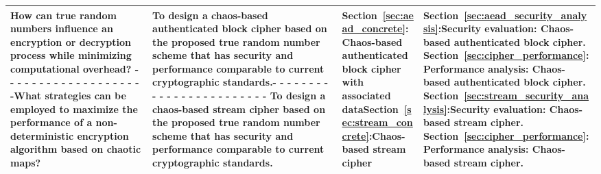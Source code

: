 {\begin{landscape}
\begin{table}[!htbp]
\begin{tabular}{M{5cm}p{6cm}M{5cm}p{7cm}}
\hline
How can true random numbers influence an encryption or decryption process while minimizing computational overhead? \newline - - - - - - - - - - - - - - - - - - - -\newline What strategies can be employed to maximize the performance of a non-deterministic encryption algorithm based on chaotic maps? & To design a chaos-based authenticated block cipher based on the proposed true random number scheme that has security and performance comparable to current cryptographic standards.\newline - - - - - - - - - - - - - - - - - - - - - - - - \newline To design a chaos-based stream cipher based on the proposed true random number scheme that has security and performance comparable to current cryptographic standards.  &\textbf{Section~\ref{sec:aead_concrete}}:\newline Chaos-based authenticated block cipher with associated data\newline \textbf{Section~\ref{sec:stream_concrete}}:\newline Chaos-based stream cipher  & \textbf{Section~\ref{sec:aead_security_analysis}}:\newline Security evaluation: Chaos-based authenticated block cipher. \newline \textbf{Section~\ref{sec:cipher_performance}}:\newline Performance analysis: Chaos-based authenticated block cipher. \newline \textbf{Section~\ref{sec:stream_security_analysis}}:\newline Security evaluation: Chaos-based stream cipher. \newline \textbf{Section~\ref{sec:cipher_performance}}:\newline Performance analysis: Chaos-based stream cipher. \\
 \hline
\end{tabular} 
\end{table}
\end{landscape}
\clearpage
}